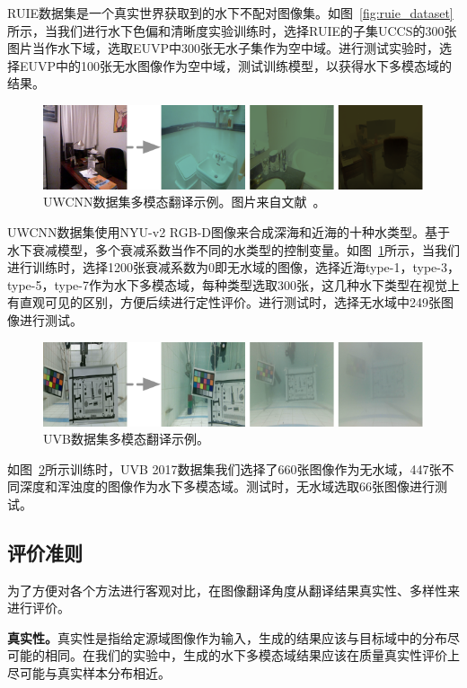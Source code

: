 RUIE数据集是一个真实世界获取到的水下不配对图像集。如图~\ref{fig:ruie_dataset}所示，当我们进行水下色偏和清晰度实验训练时，选择RUIE的子集UCCS的300张图片当作水下域，选取EUVP中300张无水子集作为空中域。进行测试实验时，选择EUVP中的100张无水图像作为空中域，测试训练模型，以获得水下多模态域的结果。

\begin{figure}[htp]
    \centering
	\includegraphics[width=\textwidth]{figures/uwcnn-dataset.pdf}
	\caption{UWCNN数据集多模态翻译示例。图片来自文献~\cite{li2020underwater}。}
	\label{fig:uwcnn_dataset}
\end{figure}

UWCNN数据集使用NYU-v2 RGB-D图像来合成深海和近海的十种水类型。基于水下衰减模型，多个衰减系数当作不同的水类型的控制变量。如图~\ref{fig:uwcnn_dataset}所示，当我们进行训练时，选择1200张衰减系数为0即无水域的图像，选择近海type-1，type-3，type-5，type-7作为水下多模态域，每种类型选取300张，这几种水下类型在视觉上有直观可见的区别，方便后续进行定性评价。进行测试时，选择无水域中249张图像进行测试。

\begin{figure}[htp]
    \centering
	\includegraphics[width=\textwidth]{figures/uvb-dataset.pdf}
	\caption{UVB数据集多模态翻译示例。}
	\label{fig:uvb_dataset}
\end{figure}

如图~\ref{fig:uvb_dataset}所示训练时，UVB 2017数据集我们选择了660张图像作为无水域，447张不同深度和浑浊度的图像作为水下多模态域。测试时，无水域选取66张图像进行测试。

\subsection{评价准则}
为了方便对各个方法进行客观对比，在图像翻译角度从翻译结果真实性、多样性来进行评价。

\textbf{真实性。}真实性是指给定源域图像作为输入，生成的结果应该与目标域中的分布尽可能的相同。在我们的实验中，生成的水下多模态域结果应该在质量真实性评价上尽可能与真实样本分布相近。

